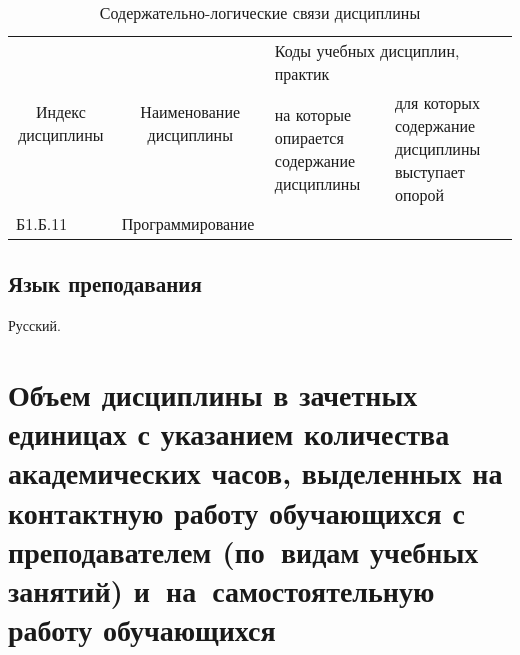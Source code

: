 \documentclass[a4paper,12pt]{article}
\begin{document}
  \begin{table}[H]
  \setlength\arraycolsep{3pt}
  \caption{Содержательно-логические связи дисциплины}
  \begin{tabular}{|l|p{18ex}|*{2}{p{23ex}|}}
  \hline
  \multicolumn{1}{|c|}{\multirow{2}{13ex}{\centering Индекс \linebreak дисциплины}} &
  \multicolumn{1}{c|}{\multirow{2}{18ex}{\centering Наименование \linebreak дисциплины}} & 
  \multicolumn{2}{p{46ex}|}{\centering Коды учебных дисциплин, практик} \\
  \cline{3-4}
   & & 
  \centering на которые опирается содержание дисциплины & 
  \centering\arraybackslash для которых содержание дисциплины выступает опорой
  \\ \hline
  Б1.Б.11 & Программирование &  & 
  \\ \hline
  \end{tabular}
  \end{table}

\subsection{Язык преподавания} 

  Русский.

\newpage

\section{Объем дисциплины в зачетных единицах с указанием количества академических часов, выделенных на контактную работу обучающихся с преподавателем (по~видам учебных занятий) и~на~самостоятельную работу обучающихся}
\end{document}
